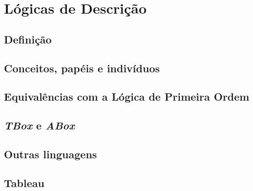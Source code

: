 \chapter{Lógicas de Descrição}

\section{Definição}

\section{Conceitos, papéis e indivíduos}

\section{Equivalências com a Lógica de Primeira Ordem}

\section{\textit{TBox} e \textit{ABox}}

\section{Outras linguagens}

\section{Tableau}